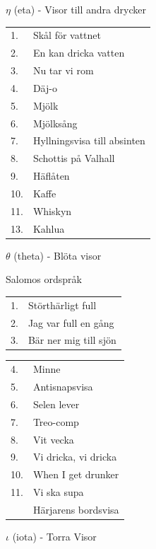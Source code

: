 \documentclass[a6paper,10pt]{article}
\begin{document}
\noindent \Large $\eta$ (eta) - Visor till andra drycker

\normalsize
\noindent
\begin{tabularx}{1\textwidth}{l X}
1.&Skål för vattnet\\
2.&En kan dricka vatten\\
3.&Nu tar vi rom\\
4.&Däj-o\\
5.&Mjölk\\
6.&Mjölksång\\
7.&Hyllningsvisa till absinten\\
8.&Schottis på Valhall\\
9.&Häflåten\\
10.&Kaffe\\
11.&Whiskyn\\
13.&Kahlua
\end{tabularx}

\vspace{5pt}

\noindent \Large $\theta$ (theta) - Blöta visor

\noindent \normalsize Salomos ordspråk

\vspace{5pt}

\noindent
\begin{tabularx}{1\textwidth}{l X}
1.&Störthärligt full\\
2.&Jag var full en gång\\
3.&Bär ner mig till sjön
\end{tabularx}

\noindent
\begin{tabularx}{1\textwidth}{l X}
4.&Minne\\
5.&Antisnapsvisa\\
6.&Selen lever\\
7.&Treo-comp\\
8.&Vit vecka\\
9.&Vi dricka, vi dricka\\
10.&When I get drunker\\
11.&Vi ska supa\\
&Härjarens bordsvisa\\
\end{tabularx}

\vspace{5pt}

\noindent \Large $\iota$ (iota) - Torra Visor
\end{document}
